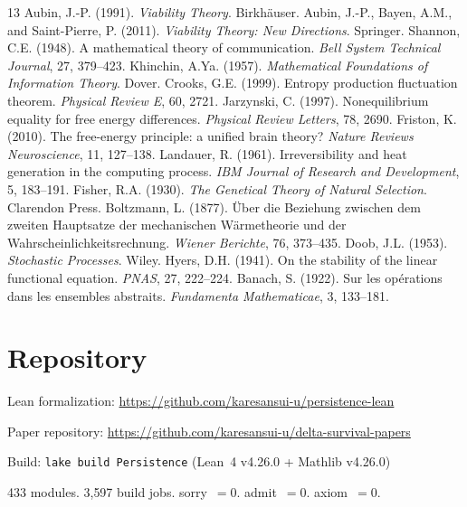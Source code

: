 \documentclass[11pt,a4paper]{article}
\begin{document}
\begin{thebibliography}{13}
 Aubin, J.-P. (1991). \emph{Viability Theory}. Birkh\"auser.
 Aubin, J.-P., Bayen, A.M., and Saint-Pierre, P. (2011). \emph{Viability Theory: New Directions}. Springer.
 Shannon, C.E. (1948). A mathematical theory of communication. \emph{Bell System Technical Journal}, 27, 379--423.
 Khinchin, A.Ya. (1957). \emph{Mathematical Foundations of Information Theory}. Dover.
 Crooks, G.E. (1999). Entropy production fluctuation theorem. \emph{Physical Review E}, 60, 2721.
 Jarzynski, C. (1997). Nonequilibrium equality for free energy differences. \emph{Physical Review Letters}, 78, 2690.
 Friston, K. (2010). The free-energy principle: a unified brain theory? \emph{Nature Reviews Neuroscience}, 11, 127--138.
 Landauer, R. (1961). Irreversibility and heat generation in the computing process. \emph{IBM Journal of Research and Development}, 5, 183--191.
 Fisher, R.A. (1930). \emph{The Genetical Theory of Natural Selection}. Clarendon Press.
 Boltzmann, L. (1877). \"Uber die Beziehung zwischen dem zweiten Hauptsatze der mechanischen W\"armetheorie und der Wahrscheinlichkeitsrechnung. \emph{Wiener Berichte}, 76, 373--435.
 Doob, J.L. (1953). \emph{Stochastic Processes}. Wiley.
 Hyers, D.H. (1941). On the stability of the linear functional equation. \emph{PNAS}, 27, 222--224.
 Banach, S. (1922). Sur les op\'erations dans les ensembles abstraits. \emph{Fundamenta Mathematicae}, 3, 133--181.
\end{thebibliography}

\appendix
\section{Repository}

Lean formalization: \url{https://github.com/karesansui-u/persistence-lean}

Paper repository: \url{https://github.com/karesansui-u/delta-survival-papers}

Build: \texttt{lake build Persistence} (Lean~4 v4.26.0 + Mathlib v4.26.0)

433 modules. 3{,}597 build jobs. sorry~$= 0$. admit~$= 0$. axiom~$= 0$.
\end{document}
